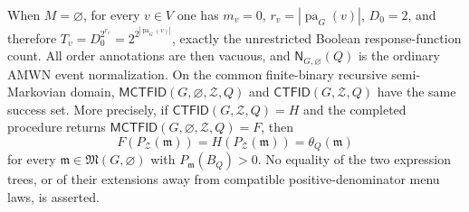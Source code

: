 When \(M=\varnothing\), for every \(v\in V\) one has \(m_v=0\), \(r_v=|\operatorname{pa}_G(v)|\), \(D_0=2\), and therefore \(T_v=D_0^{2^{r_v}}=2^{2^{|\operatorname{pa}_G(v)|}}\), exactly the unrestricted Boolean response-function count. All order annotations are then vacuous, and \(\mathsf N_{G,\varnothing}(Q)\) is the ordinary AMWN event normalization. On the common finite-binary recursive semi-Markovian domain, \(\mathsf{MCTFID}(G,\varnothing,\mathcal Z,Q)\) and \(\mathsf{CTFID}(G,\mathcal Z,Q)\) have the same success set. More precisely, if \(\mathsf{CTFID}(G,\mathcal Z,Q)=H\) and the completed procedure returns \(\mathsf{MCTFID}(G,\varnothing,\mathcal Z,Q)=F\), then
\[
 F(P_{\mathcal Z}(\mathfrak m))
 =H(P_{\mathcal Z}(\mathfrak m))
 =\theta_Q(\mathfrak m)
\]
for every \(\mathfrak m\in\mathfrak M(G,\varnothing)\) with \(P_{\mathfrak m}(B_Q)>0\). No equality of the two expression trees, or of their extensions away from compatible positive-denominator menu laws, is asserted.